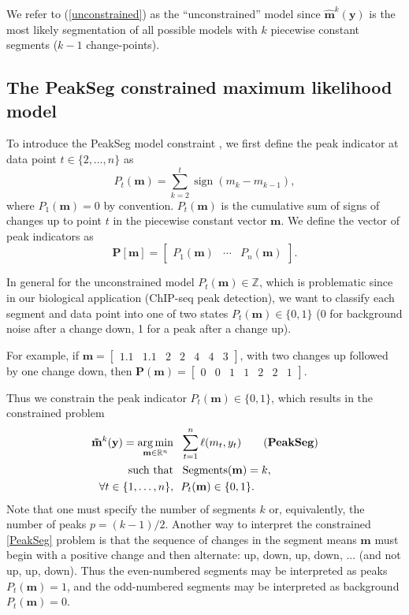 \documentclass{article}
\DeclareMathOperator*{\argmin}{arg\,min}
\DeclareMathOperator*{\sign}{sign}
\DeclareMathOperator*{\Segments}{Segments}
\newcommand{\ZZ}{\mathbb Z}
\newcommand{\RR}{\mathbb R}
\begin{document}
We refer to (\ref{unconstrained}) as the ``unconstrained'' model
since $\mathbf{\hat m}^k(\mathbf y)$ is the most likely segmentation
of all possible models with $k$ piecewise constant segments ($k-1$
change-points). 

\subsection{The PeakSeg constrained maximum likelihood model}
\label{sec:constrained}

To introduce the PeakSeg model constraint \citep{PeakSeg}, we first define
the peak indicator at data point $t\in\{2, \dots, n\}$ as
\begin{equation}
  \label{eq:peaks}
  P_t(\mathbf m) = \sum_{k=2}^t \sign( m_{k} - m_{k-1} ),
\end{equation}
where $P_1(\mathbf m)=0$ by convention. $P_t(\mathbf m)$ is the
cumulative sum of signs of changes up to point $t$ in the piecewise
constant vector $\mathbf m$. We define the vector of peak indicators
as
\begin{equation}
  \mathbf
P[\mathbf m] = \left[\begin{array}{ccc} P_1(\mathbf m) & \cdots &
    P_n(\mathbf m)
\end{array}\right].
\end{equation}

In general for the unconstrained model $P_t(\mathbf m)\in\ZZ$, which
is problematic since in our biological application (ChIP-seq peak
detection), we want to classify each segment and data point into one
of two states $P_t(\mathbf m)\in \{0, 1\}$ (0 for background noise
after a change down, 1 for a peak after a change up).

For example, if $\mathbf m = \left[\begin{array}{ccccccc}1.1 &
    1.1 & 2 & 2 & 4 & 4 & 3\end{array}\right]$, with two changes up
followed by one change down, then $\mathbf P(\mathbf m) =
\left[\begin{array}{ccccccc}0 & 0 & 1 & 1 & 2 & 2 &
    1 \end{array}\right]$.

Thus we constrain the peak indicator $P_t(\mathbf
m)\in\{0, 1\}$, which results
in the constrained problem
\begin{align*}
  \label{PeakSeg}
  \mathbf{\tilde m}^k(\mathbf y)  =
    \argmin_{\mathbf m\in\RR^{n}} &\ \ 
    \sum_{t=1}^n \ell( m_t,  y_t) 
    \tag{\textbf{PeakSeg}}
\\
    \text{such that} &\ \  \Segments(\mathbf m)=k,  \\
     \forall t\in\{1, \dots, n\}, &\ \ P_t(\mathbf m) \in\{0, 1\}.
\end{align*}
Note that one must specify the number of segments $k$ or,
equivalently, the number of peaks $p=(k-1)/2$. Another way to
interpret the constrained \ref{PeakSeg} problem is that the sequence
of changes in the segment means $\mathbf m$ must begin with a positive
change and then alternate: up, down, up, down, ... (and not up, up,
down). Thus the even-numbered segments may be interpreted as peaks
$P_t(\mathbf m)=1$, and the odd-numbered segments may be interpreted
as background $P_t(\mathbf m)=0$.
\end{document}
